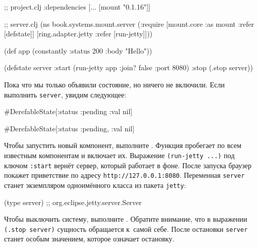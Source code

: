 \else

\begin{english}
  \begin{clojure}
;; project.clj
:dependencies [... [mount "0.1.16"]]

;; server.clj
(ns book.systems.mount.server
  (:require
   [mount.core :as mount :refer [defstate]]
   [ring.adapter.jetty :refer [run-jetty]]))

(def app (constantly {:status 200 :body "Hello"}))

(defstate server
  :start (run-jetty app {:join? false :port 8080})
  :stop (.stop server))
  \end{clojure}
\end{english}

\fi

Пока что мы только объявили состояние, но ничего не включили. Если выполнить
\verb|server|, увидим следующее:

\ifnarrow

\begin{english}
  \begin{clojure}
#DerefableState[{:status :pending
                 :val nil}]
  \end{clojure}
\end{english}

\else

\begin{english}
  \begin{clojure}
#DerefableState[{:status :pending, :val nil}]
  \end{clojure}
\end{english}

\fi

Чтобы запустить новый компонент, выполните . Функция
пробегает по всем известным компонентам и включает их. Выражение
\verb|(run-jetty ...)| под ключом \verb|:start| вернёт сервер, который работает
в фоне. После запуска браузер покажет приветствие по адресу
\verb|http://127.0.0.1:8080|. Переменная \verb|server| станет экземпляром
одноимённого класса из пакета \verb|jetty|:

\begin{english}
  \begin{clojure}
(type server)
;; org.eclipse.jetty.server.Server
  \end{clojure}
\end{english}

Чтобы выключить систему, выполните . Обратите внимание, что в
выражении \verb|(.stop server)| сущность обращается к~самой себе. После
остановки \verb|server| станет особым значением, которое означает остановку.

